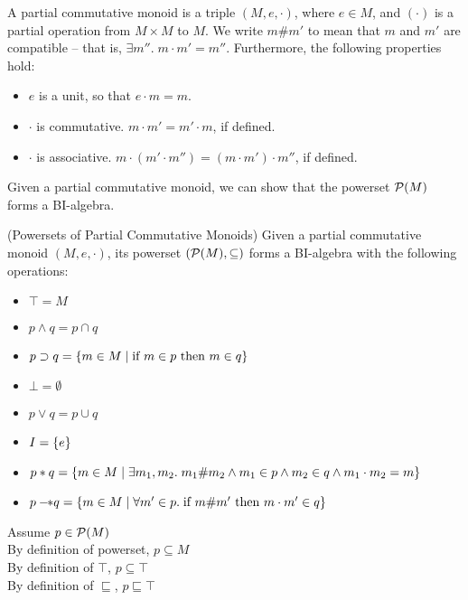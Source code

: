 A partial commutative monoid is a triple $(M, e, \cdot)$, where 
$e \in M$, and $(\cdot)$ is a partial operation from $M \times M$ to 
$M$. We write $m \# m'$ to mean that $m$ and $m'$ are compatible -- 
that is, $\exists m''.\; m \cdot m' = m''$. Furthermore, the following
properties hold: 

\begin{itemize}
\item $e$ is a unit, so that $e \cdot m = m$. 
\item $\cdot$ is commutative. $m \cdot m' = m' \cdot m$, if defined.
\item $\cdot$ is associative. $m \cdot (m' \cdot m'') = (m \cdot m') \cdot m''$, if defined.
\end{itemize}

Given a partial commutative monoid, we can show that the powerset $\mathcal{P}(M)$ 
forms a BI-algebra. 

\begin{lemma}{(Powersets of Partial Commutative Monoids)}
Given a partial commutative monoid $(M, e, \cdot)$, its powerset
$(\mathcal{P}(M), \subseteq)$ forms a BI-algebra
with the following operations:

\begin{itemize}
\item $\top = M$
\item $p \land q = p \cap q$
\item $p \supset q = \{{m \in M \;|\;\mbox{if }m \in p \mbox{ then } m \in q}\}$
\item $\bot = \emptyset$ 
\item $p \vee q = p \cup q$
\item $I = \{{e}\}$
\item $p * q = \{{m \in M\;|\; \exists m_1, m_2.\; 
                       m_1 \# m_2 \land m_1 \in p \land m_2 \in q \land m_1\cdot m_2 = m}\}$
\item $p -\!\!* q = \{ m \in M \;|\; \forall m' \in p.\; \mbox{if } m \# m' \mbox{ then } m \cdot m' \in q \}$
\end{itemize}
\end{lemma}

  \begin{tabbedproof}
        Assume $p \in \mathcal{P}(M)$ \\
    \oo By definition of powerset, $p \subseteq M$ \\
    \oo By definition of $\top$, $p \subseteq \top$ \\
    \oo By definition of $\sqsubseteq$, $p \sqsubseteq \top$ \\
  \end{tabbedproof}


